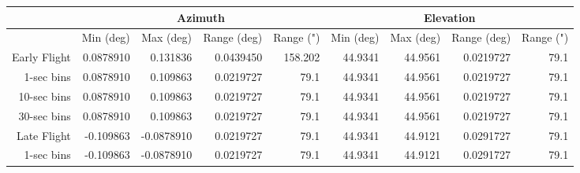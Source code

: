\begin{table}[htbp]
\begin{tabular}{|r|r|r|r|r|r|r|r|r|}
\hline
\multicolumn{1}{|l|}{} & \multicolumn{4}{c|}{Azimuth}                                                                                                             & \multicolumn{4}{c|}{Elevation}                                                                                                           \\ \hline
\multicolumn{1}{|l|}{} & \multicolumn{1}{c|}{Min (deg)} & \multicolumn{1}{c|}{Max (deg)} & \multicolumn{1}{c|}{Range (deg)} & \multicolumn{1}{c|}{Range (")} & \multicolumn{1}{c|}{Min (deg)} & \multicolumn{1}{c|}{Max (deg)} & \multicolumn{1}{c|}{Range (deg)} & \multicolumn{1}{c|}{Range (")} \\ \hline
Early Flight           & 0.0878910                      & 0.131836                       & 0.0439450                        & 158.202                             & 44.9341                        & 44.9561                        & 0.0219727                        & 79.1                                \\ \hline
1-sec bins             & 0.0878910                      & 0.109863                       & 0.0219727                        & 79.1                                & 44.9341                        & 44.9561                        & 0.0219727                        & 79.1                                \\ \hline
10-sec bins            & 0.0878910                      & 0.109863                       & 0.0219727                        & 79.1                                & 44.9341                        & 44.9561                        & 0.0219727                        & 79.1                                \\ \hline
30-sec bins            & 0.0878910                      & 0.109863                       & 0.0219727                        & 79.1                                & 44.9341                        & 44.9561                        & 0.0219727                        & 79.1                                \\ \hline
Late Flight            & -0.109863                      & -0.0878910                     & 0.0219727                        & 79.1                                & 44.9341                        & 44.9121                        & 0.0291727                        & 79.1                                \\ \hline
1-sec bins             & -0.109863                      & -0.0878910                     & 0.0219727                        & 79.1                                & 44.9341                        & 44.9121                        & 0.0291727                        & 79.1                                \\ \hline

\end{tabular}
\end{table}
